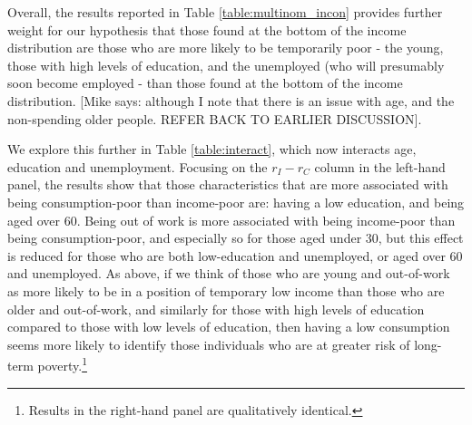 
Overall, the results reported in Table \ref{table:multinom_incon} provides further weight for our hypothesis that those found at the bottom of the income distribution are those who are more likely to be temporarily poor - the young, those with high levels of education, and the unemployed (who will presumably soon become employed - than those found at the bottom of the income distribution. [Mike says: although I note that there is an issue with age, and the non-spending older people. REFER BACK TO EARLIER DISCUSSION].

We explore this further in Table \ref{table:interact}, which now interacts age, education and unemployment. Focusing on the  $r_{I}-r_{C}$ column in the left-hand panel, the results show that those characteristics that are more associated with being consumption-poor than income-poor are: having a low education, and being aged over 60. Being out of work is more associated with being income-poor than being consumption-poor, and especially so for those aged under 30, but this effect is reduced for those who are both low-education and unemployed, or aged over 60 and unemployed. As above, if we think of those who are young and out-of-work as more likely to be in a position of temporary low income than those who are older and out-of-work, and similarly for those with high levels of education compared to those with low levels of education, then having a low consumption seems more likely to identify those individuals who are at greater risk of long-term poverty.\footnote{Results in the right-hand panel are qualitatively identical.}


